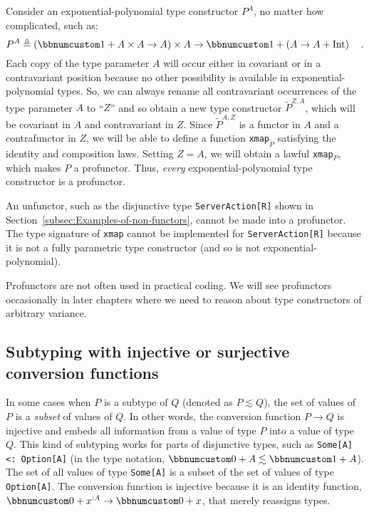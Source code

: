Consider an exponential-polynomial type constructor $P^{A}$, no matter
how complicated, such as:
\[
P^{A}\triangleq\left(\bbnum 1+A\times A\rightarrow A\right)\times A\rightarrow\bbnum 1+\left(A\rightarrow A+\text{Int}\right)\quad.
\]
Each copy of the type parameter $A$ will occur either in covariant
or in a contravariant position because no other possibility is available
in exponential-polynomial types. So, we can always rename all contravariant
occurrences of the type parameter $A$ to \textsf{``}$Z$\textsf{''} and so obtain
a new type constructor $\tilde{P}^{Z,A}$, which will be covariant
in $A$ and contravariant in $Z$. Since $\tilde{P}^{A,Z}$ is a functor
in $A$ and a contrafunctor in $Z$, we will be able to define a function
\lstinline!xmap!$_{\tilde{P}}$ satisfying the identity and composition
laws. Setting $Z=A$, we will obtain a lawful \lstinline!xmap!$_{P}$,
which makes $P$ a profunctor. Thus, \emph{every} exponential-polynomial
type constructor is a profunctor.

An unfunctor, such as the disjunctive type \lstinline!ServerAction[R]!
shown in Section~\ref{subsec:Examples-of-non-functors}, cannot be
made into a profunctor. The type signature of \lstinline!xmap! cannot
be implemented for \lstinline!ServerAction[R]! because it is not
a fully parametric type constructor (and so is not exponential-polynomial).

Profunctors are not often used in practical coding. We will see profunctors
occasionally in later chapters where we need to reason about type
constructors of arbitrary variance.

\subsection{Subtyping with injective or surjective conversion functions\label{subsec:Subtyping-with-injective}}

In some cases when $P$ is a subtype of $Q$ (denoted as $P\lesssim Q$),
the set of values of $P$ is a \emph{subset} of values of $Q$. In
other words, the conversion function $P\rightarrow Q$ is injective
and embeds all information from a value of type $P$ into a value
of type $Q$. This kind of subtyping works for parts of disjunctive
types, such as \lstinline!Some[A] <: Option[A]! (in the type notation,
$\bbnum 0+A\lesssim\bbnum 1+A$). The set of all values of type \lstinline!Some[A]!
is a subset of the set of values of type \lstinline!Option[A]!. The
conversion function is injective because it is an identity function,
$\bbnum 0+x^{:A}\rightarrow\bbnum 0+x$, that merely reassigns types.

